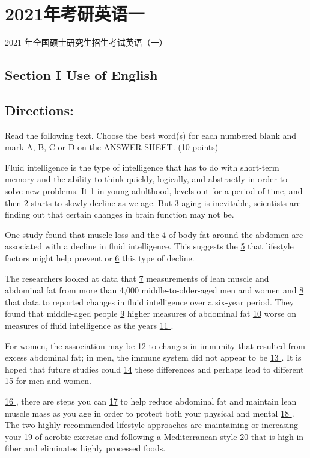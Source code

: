 \documentclass[UTF8,11pt]{ctexart}
\begin{document}
\section*{2021年考研英语一}
2021 年全国硕士研究生招生考试英语（一）


\subsection*{\textbf{Section I Use of English}}


\subsection*{\textbf{Directions:}}


Read the following text. Choose the best word(s) for each numbered blank and mark A, B, C or D on the ANSWER SHEET. (10 points)


Fluid intelligence is the type of intelligence that has to do with short-term memory and the ability to think quickly, logically, and abstractly in order to solve new problems. It \uline{1} in young adulthood, levels out for a period of time, and then \uline{2} starts to slowly decline as we age. But \uline{3} aging is inevitable, scientists are finding out that certain changes in brain function may not be.


One study found that muscle loss and the \uline{4} of body fat around the abdomen are associated with a decline in fluid intelligence. This suggests the \uline{5} that lifestyle factors might help prevent or \uline{6} this type of decline.


The researchers looked at data that \uline{7} measurements of lean muscle and abdominal fat from more than 4,000 middle-to-older-aged men and women and \uline{8} that data to reported changes in fluid intelligence over a six-year period. They found that middle-aged people \uline{9} higher measures of abdominal fat \uline{10} worse on measures of fluid intelligence as the years \uline{11 }.


For women, the association may be \uline{12} to changes in immunity that resulted from excess abdominal fat; in men, the immune system did not appear to be \uline{13 }. It is hoped that future studies could \uline{14} these differences and perhaps lead to different \uline{15} for men and women.


\uline{16 }, there are steps you can \uline{17} to help reduce abdominal fat and maintain lean muscle mass as you age in order to protect both your physical and mental \uline{18 }. The two highly recommended lifestyle approaches are maintaining or increasing your \uline{19} of aerobic exercise and following a Mediterranean-style \uline{20} that is high in fiber and eliminates highly processed foods.
\end{document}
